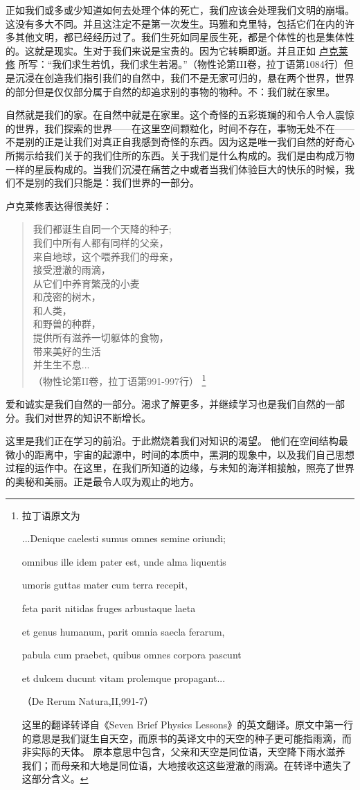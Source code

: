    正如我们或多或少知道如何去处理个体的死亡，我们应该会处理我们文明的崩塌。这没有多大不同。并且这注定不是第一次发生。玛雅和克里特，包括它们在内的许多其他文明，都已经经历过了。我们生死如同星辰生死，都是个体性的也是集体性的。这就是现实。生对于我们来说是宝贵的。因为它转瞬即逝。并且正如
\href{http://toyhouse.cc/wiki/index.php/卢克莱修}{卢克莱修}
所写：“我们求生若饥，我们求生若渴。”（物性论第III卷，拉丁语第1084行）但是沉浸在创造我们指引我们的自然中，我们不是无家可归的，悬在两个世界，世界的部分但是仅仅部分属于自然的却追求别的事物的物种。不：我们就在家里。

    自然就是我们的家。在自然中就是在家里。这个奇怪的五彩斑斓的和令人令人震惊的世界，我们探索的世界——在这里空间颗粒化，时间不存在，事物无处不在——不是别的正是让我们对真正自我感到奇怪的东西。因为这是唯一我们自然的好奇心所揭示给我们关于的我们住所的东西。关于我们是什么构成的。我们是由构成万物一样的星辰构成的。当我们沉浸在痛苦之中或者当我们体验巨大的快乐的时候，我们不是别的我们只能是：我们世界的一部分。
 
   卢克莱修表达得很美好：
\begin{verse} 
我们都诞生自同一个天降的种子;\\
我们中所有人都有同样的父亲，\\
来自地球，这个喂养我们的母亲，\\
接受澄澈的雨滴，\\
从它们中养育繁茂的小麦\\
和茂密的树木，\\
和人类，\\
和野兽的种群，\\
提供所有滋养一切躯体的食物，\\
带来美好的生活\\
并生生不息...\\
（物性论第II卷，拉丁语第991-997行）
\footnote[5]
{
拉丁语原文为

...Denique caelesti sumus omnes semine oriundi;

omnibus ille idem pater est, unde alma liquentis

umoris guttas mater cum terra recepit,

feta parit nitidas fruges arbustaque laeta

et genus humanum, parit omnia saecla ferarum,

pabula cum praebet, quibus omnes corpora pascunt

et dulcem ducunt vitam prolemque propagant...

（De Rerum Natura,II,991-7）

这里的翻译转译自《Seven Brief Physics Lessons》的英文翻译。原文中第一行的意思是我们诞生自天空，而原书的英译文中的天空的种子更可能指雨滴，而非实际的天体。
原本意思中包含，父亲和天空是同位语，天空降下雨水滋养我们；而母亲和大地是同位语，大地接收这这些澄澈的雨滴。在转译中遗失了这部分含义。
}
\end{verse} 


    爱和诚实是我们自然的一部分。渴求了解更多，并继续学习也是我们自然的一部分。我们对世界的知识不断增长。
 
   这里是我们正在学习的前沿。于此燃烧着我们对知识的渴望。 他们在空间结构最微小的距离中，宇宙的起源中，时间的本质中，黑洞的现象中，以及我们自己思想过程的运作中。在这里，在我们所知道的边缘，与未知的海洋相接触，照亮了世界的奥秘和美丽。正是最令人叹为观止的地方。




\noindent
